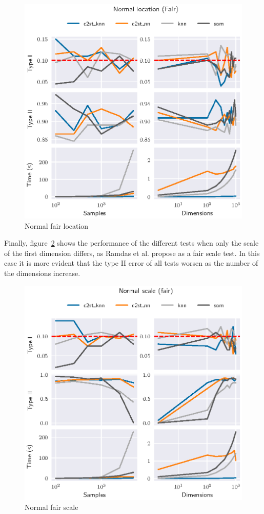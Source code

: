 \begin{figure}[htbp]
    \centering
    \includegraphics{images/4_som/normal_location_fair}
    \caption{Normal fair location}
    \label{fig:normal_fair_location}
\end{figure}

Finally, figure~\ref{fig:normal_fair_scale} shows the performance of the different
tests when only the scale of the first dimension differs, as Ramdas et al. propose
as a fair scale test. In this case it is more evident that the type II error of all
tests worsen as the number of the dimensions increase.

\begin{figure}[htbp]
    \centering
    \includegraphics{images/4_som/normal_scale_fair}
    \caption{Normal fair scale}
    \label{fig:normal_fair_scale}
\end{figure}

